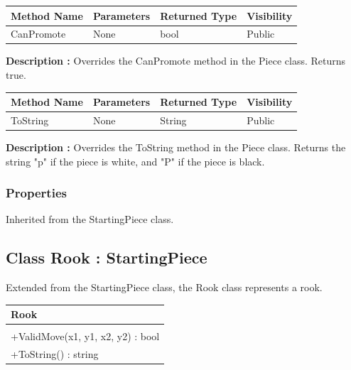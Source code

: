 \documentclass[12pt]{article}
\begin{document}
    \begin{table}[H]
        \begin{tabular}{|l|l|l|l|}
            \hline
            \rowcolor[HTML]{EFEFEF}
            \cellcolor[HTML]{EFEFEF}\textbf{Method Name} & \textbf{Parameters} & \textbf{Returned Type} & \textbf{Visibility} \\ \hline
            CanPromote                                   & None                & bool                   & Public              \\ \hline
        \end{tabular}
    \end{table}

    \textbf{Description :} Overrides the CanPromote method in the Piece class.
    Returns true.

    \begin{table}[H]
        \begin{tabular}{|l|l|l|l|}
            \hline
            \rowcolor[HTML]{EFEFEF}
            \cellcolor[HTML]{EFEFEF}\textbf{Method Name} & \textbf{Parameters} & \textbf{Returned Type} & \textbf{Visibility} \\ \hline
            ToString                                     & None                & String                 & Public              \\ \hline
        \end{tabular}
    \end{table}

    \textbf{Description :} Overrides the ToString method in the Piece class.
    Returns the string "p" if the piece is white, and "P" if the piece is black.

    \subsubsection{Properties}

    Inherited from the StartingPiece class.
    \newpage


    \subsection{Class Rook : StartingPiece}

    Extended from the StartingPiece class, the Rook class represents a rook.
    \begin{table}[H]
        \begin{tabular}{|l|}
            \hline
            \cellcolor[HTML]{C0C0C0}\textbf{Rook} \\ \hline
            \cellcolor[HTML]{EFEFEF}              \\ \hline
            +ValidMove(x1, y1, x2, y2) : bool     \\ \hline
            +ToString() : string                  \\ \hline
        \end{tabular}
    \end{table}
\end{document}
